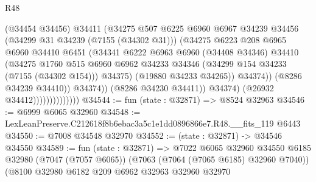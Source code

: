 \begin{lexlean}{R48}
\begin{coremodule}
                                        (@34454 @34456)
                                        @34411
                                        (@34275
                                          @507
                                          @6225
                                          @6960
                                          @6967
                                          @34239
                                          @34456
                                          (@34299 @31 @34239 (@7155 (@34302 @31)))
                                          (@34275
                                            @6223
                                            @208
                                            @6965
                                            @6960
                                            @34410
                                            @6451
                                            (@34341
                                              @6222
                                              @6963
                                              @6960
                                              (@34408 @34346)
                                              @34410
                                              (@34275
                                                @1760
                                                @515
                                                @6960
                                                @6962
                                                @34233
                                                @34346
                                                (@34299 @154 @34233 (@7155 (@34302 @154)))
                                                @34375)
                                              (@19880 @34233 @34265))
                                            @34374))
                                        (@8286 @34239 @34410))
                                      @34374))
                                  (@8286 @34230 @34411))
                                @34374)
                              (@26932 @34412))))))))))))))
@34544 := fun (state : @32871) => @8524 @32963
@34546 := @6999 @6065 @32960
@34548 := LexLeanPreserve.C212618f8b6ebac3a5c1e1dd0896866e7.R48.__fits_119 @6443
@34550 := @7008 @34548 @32970
@34552 := (state : @32871) -> @34546 @34550
@34589 := fun (state : @32871) =>
  @7022
    @6065
    @32960
    @34550
    @6185
    @32980
    (@7047 (@7057 @6065))
    (@7063 (@7064 (@7065 @6185) @32960 @7040))
    (@8100
      @32980
      @6182
      @209
      @6962
      @32963
      @32960
      @32970

\end{coremodule}
\end{lexlean}

